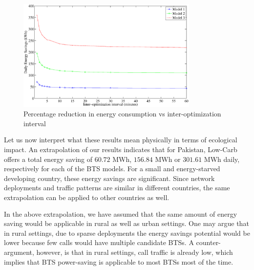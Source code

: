 \begin{figure}
\centering
\includegraphics[width=0.8\textwidth]{pics/e.savings.red-bl.eps}
\caption{Percentage reduction in energy consumption vs inter-optimization interval}
\label{fig:case2:results3}
\end{figure}


Let us now interpret what these results mean physically in terms of ecological impact. An extrapolation of our results indicates that for Pakistan, Low-Carb offers a total energy saving of $60.72$ MWh, $156.84$ MWh or $301.61$ MWh daily, respectively for each of the BTS models. For a small and energy-starved developing country, these energy savings are significant. Since network deployments and traffic patterns are similar in different countries, the same extrapolation can be applied to other countries as well.

In the above extrapolation, we have assumed that the same amount of energy saving would be applicable in rural as well as urban settings. One may argue that in rural settings, due to sparse deployments the energy savings potential would be lower because few calls would have multiple candidate BTSs. A counter-argument, however, is that in rural settings, call traffic is already low, which implies that BTS power-saving is applicable to most BTSs most of the time. 

